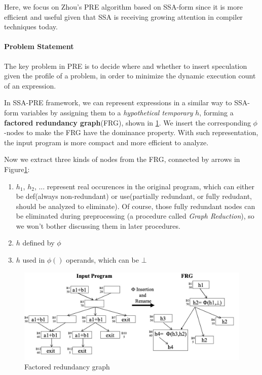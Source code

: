 \begin{exercise}[]
\begin{solution}
  Here, we focus on Zhou's PRE algorithm based on SSA-form since it is more efficient and useful given that SSA is receiving growing attention in compiler techniques today.

  \paragraph{Problem Statement}  The key problem in PRE is to decide where and whether to insert speculation given the profile of a problem, in order to minimize the dynamic execution count of an expression. 
  
  In SSA-PRE framework, we can represent expressions in a similar way to SSA-form variables by assigning them to a \textit{hypothetical temporary} $h$, forming a \textbf{factored redundancy graph}(FRG), shown in \ref{frg}. We insert the corresponding $\phi$-nodes to make the FRG have the dominance property. With such representation, the input program is more compact and more efficient to analyze.

  Now we extract three kinds of nodes from the FRG, connected by arrows in Figure\ref{frg}:
  \begin{enumerate}
    \item $h_1$, $h_2$, ... represent real occurences in the original program, which can either be def(always non-redundant) or use(partially redundant, or fully redudant, should be analyzed to eliminate). Of course, those fully redundant nodes can be eliminated during preprocessing (a procedure called \textit{Graph Reduction}), so we won't bother discussing them in later procedures.
    \item $h$ defined by $\phi$
    \item $h$ used in $\phi()$ operands, which can be $\bot$
  \end{enumerate}

  \begin{figure}
    \centering
    \includegraphics[width=12cm]{img/ex6-frg.jpg}
    \caption{Factored redundancy graph}
    \label{frg}
  \end{figure}


\end{solution}
\end{exercise}
